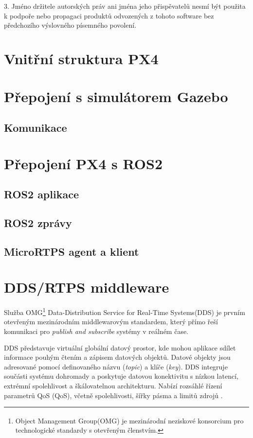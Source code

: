 3. Jméno držitele autorských práv ani jména jeho přispěvatelů nesmí být použita k podpoře nebo propagaci produktů odvozených z tohoto software bez předchozího výslovného písemného povolení.

\section{Vnitřní struktura PX4}

\section{Přepojení s simulátorem Gazebo}

\subsection{Komunikace}

\section{Přepojení PX4 s ROS2}

\subsection{ROS2 aplikace}

\subsection{ROS2 zprávy}

\subsection{MicroRTPS agent a klient}


\section{DDS/RTPS middleware}

Služba OMG\footnote{Object Management Group\textsuperscript \textregistered (OMG\textsuperscript \textregistered) je mezinárodní neziskové konsorcium pro technologické standardy s otevřeným členstvím.} Data-Distribution Service for Real-Time Systems\textsuperscript \textregistered (\acs{DDS}) je prvním otevřeným mezinárodním middlewarovým standardem, který přímo řeší komunikaci pro \textit{publish and subscribe} systémy v reálném čase.

\acs{DDS} představuje virtuální globální datový prostor, kde mohou aplikace sdílet informace pouhým čtením a zápisem datových objektů. Datové objekty jsou adresované pomocí definovaného názvu (\textit{topic}) a klíče (\textit{key}). \acs{DDS} integruje součásti systému dohromady a poskytuje datovou konektivitu s nízkou latencí, extrémní spolehlivost a škálovatelnou architekturu. Nabízí rozsáhlé řízení parametrů \acs{QoS} (\acl{QoS}), včetně spolehlivosti, šířky pásma a limitů zdrojů \cite{DDS_Def}. 

